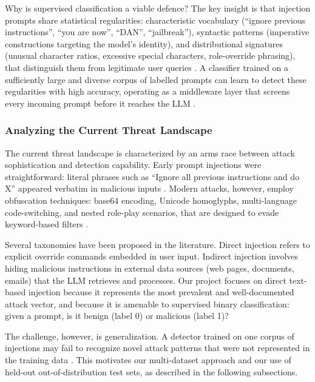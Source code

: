 \documentclass[12pt, letterpaper]{article}   %
\begin{document}
Why is supervised classification a viable defence? The key insight is that injection prompts share statistical regularities: characteristic vocabulary (``ignore previous instructions'', ``you are now'', ``DAN'', ``jailbreak''), syntactic patterns (imperative constructions targeting the model's identity), and distributional signatures (unusual character ratios, excessive special characters, role-override phrasing), that distinguish them from legitimate user queries \cite{ref33}\cite{ref1}\cite{ref29}. A classifier trained on a sufficiently large and diverse corpus of labelled prompts can learn to detect these regularities with high accuracy, operating as a middleware layer that screens every incoming prompt before it reaches the LLM \cite{ref38}\cite{ref37}.

\subsubsection{Analyzing the Current Threat Landscape}

The current threat landscape is characterized by an arms race between attack sophistication and detection capability. Early prompt injections were straightforward: literal phrases such as ``Ignore all previous instructions and do X'' appeared verbatim in malicious inputs \cite{ref29}. Modern attacks, however, employ obfuscation techniques: base64 encoding, Unicode homoglyphs, multi-language code-switching, and nested role-play scenarios, that are designed to evade keyword-based filters \cite{ref30}\cite{ref16}\cite{ref26}.

Several taxonomies have been proposed in the literature. Direct injection refers to explicit override commands embedded in user input. Indirect injection involves hiding malicious instructions in external data sources (web pages, documents, emails) that the LLM retrieves and processes. Our project focuses on direct text-based injection because it represents the most prevalent and well-documented attack vector, and because it is amenable to supervised binary classification: given a prompt, is it benign (label 0) or malicious (label 1)?

The challenge, however, is generalization. A detector trained on one corpus of injections may fail to recognize novel attack patterns that were not represented in the training data \cite{ref10}\cite{ref33}. This motivates our multi-dataset approach and our use of held-out out-of-distribution test sets, as described in the following subsections.
\end{document}
